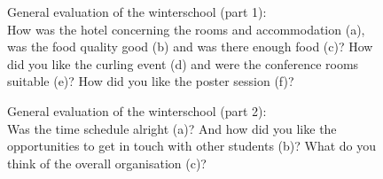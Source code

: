 \documentclass[11pt,a4paper]{article}
\numberwithin{equation}{section}
\numberwithin{table}{section}\setlength{\multlinegap}{25pt}
\begin{document}
\begin{figure}[H]
\hfill %
\hfill\null %
\caption{General evaluation of the winterschool (part 1):\\ How was the hotel concerning the rooms and accommodation (a), was the food quality good (b) and was there enough food (c)? How did you like the curling event (d) and were the conference rooms suitable (e)? How did you like the poster session (f)? }
\end{figure}  

\begin{figure}[H]
\centering
\null\hfill %
\hfill %
\hfill %
\hfill\null %
\caption{General evaluation of the winterschool (part 2):\\ Was the time schedule alright (a)? And how did you like the opportunities to get in touch with other students (b)? What do you think of the overall organisation (c)?}
\end{figure} 
\end{document}
